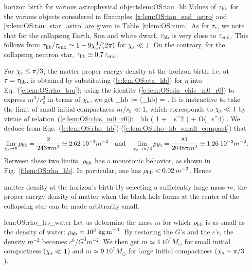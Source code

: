 \begin{texample}{horizon birth for various astrophysical objects}{lem:OS:tau_hb}
Values of $\tau_{\rm hb}$ for the various objects considered in
Examples~\ref{x:lem:OS:tau_end_astro} and \ref{x:lem:OS:tau_star_astro}
are given in Table~\ref{t:lem:OS:num}. As for $\tau_*$, we note that
for the collapsing Earth, Sun and white dwarf,
$\tau_{\rm hb}$ is very close to $\tau_{\rm end}$. This follows from
$\tau_{\rm hb} / \tau_{\rm end}  \simeq 1 - 9 \chi_{\rm s}^3/(2\pi)$ for $\chi_{\rm s} \ll 1$.
On the contrary, for the collapsing neutron star,
$\tau_{\rm hb} \simeq 0.7 \, \tau_{\rm end}$.
\end{texample}


For $\chi_{\rm s} \leq \pi/3$, the matter proper energy density at the horizon birth,
i.e. at $\tau = \tau_{\rm hb}$, is obtained by substituting (\ref{e:lem:OS:eta_hb})
for $\eta$ into Eq.~(\ref{e:lem:OS:rho_tau}); using the identity (\ref{e:lem:OS:sin_chis_m0_r0})
to express $m^3/r_0^3$ in terms of $\chi_{\rm s}$, we get
\be \label{e:lem:OS:rho_hb}
    \rho_{\rm hb} := \rho(\tau_{\rm hb}) =   .
\ee
It is instructive to take the limit of small initial compactness $m/r_0 \ll 1$,
which corresponds to $\chi_{\rm s} \ll 1$ by virtue of relation~(\ref{e:lem:OS:chis_m0_r0}):
\be \label{e:lem:OS:rho_hb_small_compact}
    \rho_{\rm hb}\simeq {} \left( 1 +  \chi_{\rm s}^2 \right)
    + O(\chi_{\rm s}^4) .
\ee
We deduce from Eqs.~(\ref{e:lem:OS:rho_hb})-(\ref{e:lem:OS:rho_hb_small_compact}) that
\[
    \lim_{\chi_{\rm s}\to 0} \rho_{\rm hb} = \frac{2}{243\pi m^2}
    \simeq 2.62\; 10^{-3} m^{-2}
    \quad\mbox{and}\quad
    \lim_{\chi_{\rm s}\to \pi/3}  \rho_{\rm hb} = \frac{81}{2048\pi m^2}
    \simeq 1.26\; 10^{-2}  m^{-2}.
\]
Between these two limits, $\rho_{\rm hb}$ has a monotonic behavior, as shown in
Fig.~\ref{f:lem:OS:rho_hb}. In particular, one has
$\rho_{\rm hb} < 0.02 \, m^{-2}$.
Hence
\begin{tprop}{matter density at the horizon's birth}{}
By selecting a sufficiently large mass $m$, the proper energy density
of matter when the black hole forms at the center of the collapsing star
can be made arbitrarily small.
\end{tprop}

\begin{texample}{}{lem:OS:rho_hb_water}
Let us determine the mass $m$ for which  $\rho_{\rm hb}$ is as small as
the density of water: $\rho_{\rm hb} = 10^3 \; {\rm kg\, m}^{-3}$.
By restoring the $G$'s and the $c$'s, the density $m^{-2}$ becomes
$c^6/G^3 m^{-2}$.  We then get $m \simeq 4\; 10^7 M_\odot$ for small initial compactness
($\chi_{\rm s} \ll 1$)
and $m \simeq 9\; 10^7 M_\odot$ for large initial compactness
($\chi_{\rm s} \sim \pi/3$).
\end{texample}


